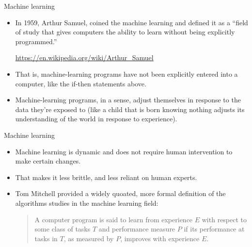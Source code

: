 \documentclass{beamer}
\begin{document}
\begin{frame}{Machine learning}
\begin{itemize}
\item In 1959, Arthur Samuel, coined the machine learning and defined it as a ``field of study that gives computers the ability to learn without being explicitly programmed.''

\url{https://en.wikipedia.org/wiki/Arthur_Samuel}

\item That is, machine-learning programs have not been explicitly entered into a computer, like the if-then statements above. 

\item Machine-learning programs, in a sense, adjust themselves in response to the data they’re exposed to (like a child that is born knowing nothing adjusts its understanding of the world in response to experience).
\end{itemize}
\end{frame}

\begin{frame}{Machine learning}

\begin{itemize}
\item Machine learning is dynamic and does not require human intervention to make certain changes. 

\item That makes it less brittle, and less reliant on human experts.

\item Tom Mitchell provided a widely quoated, more formal definition of the algorithms studies in the machine learning field:

\medskip
\begin{quote}
A computer program is said to learn from experience $E$ with respect to some class of tasks $T$ and performance measure $P$ if its performance at tasks in $T$, as measured by $P$, improves with experience $E$.
\end{quote}
\end{itemize}

\end{frame}
\end{document}
